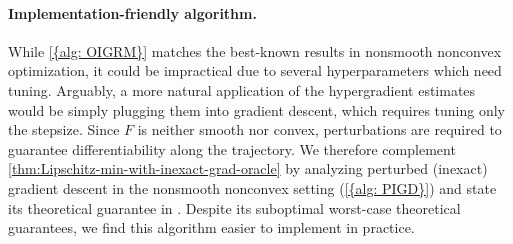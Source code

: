 \paragraph{Implementation-friendly algorithm.}
While \cref{{alg: OIGRM}} matches the best-known results in nonsmooth nonconvex optimization, it could be  impractical  due to several hyperparameters which need tuning. 
Arguably, a more natural application of the hypergradient estimates would be simply plugging them into gradient descent, which requires tuning only the stepsize. Since  $F$ is neither smooth nor convex, perturbations are required to guarantee differentiability along the trajectory.
We therefore complement \cref{thm:Lipschitz-min-with-inexact-grad-oracle} by analyzing perturbed (inexact) gradient descent  in the nonsmooth nonconvex setting (\cref{{alg: PIGD}}) and state its theoretical guarantee in . Despite its suboptimal worst-case theoretical guarantees, we find this algorithm  easier to implement in practice. 
